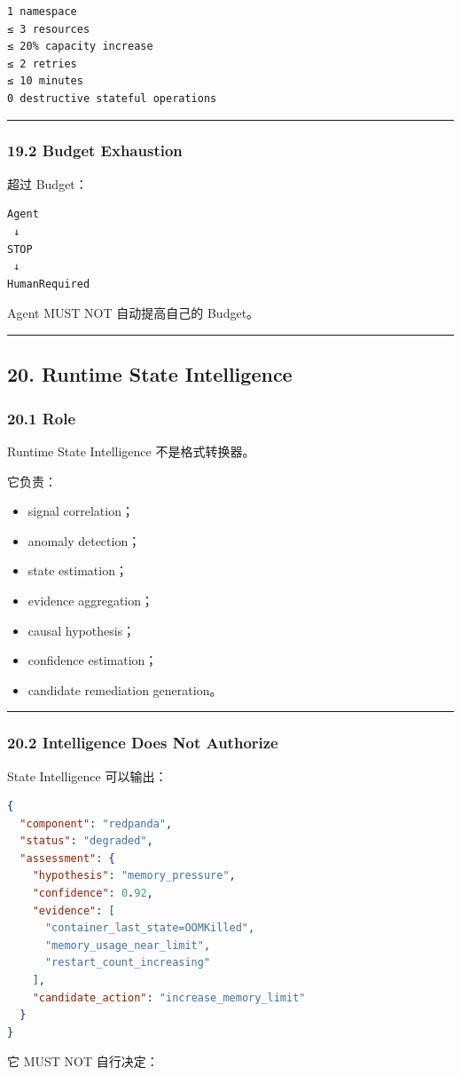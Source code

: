 \documentclass[11pt,a4paper]{article}
\begin{document}
\begin{lstlisting}[language=text]
1 namespace
≤ 3 resources
≤ 20% capacity increase
≤ 2 retries
≤ 10 minutes
0 destructive stateful operations
\end{lstlisting}
\vspace{0.5em}\hrule\vspace{0.5em}
\subsubsection{19.2 Budget Exhaustion}
超过 Budget：

\begin{lstlisting}[language=text]
Agent
 ↓
STOP
 ↓
HumanRequired
\end{lstlisting}
Agent MUST NOT 自动提高自己的 Budget。

\vspace{0.5em}\hrule\vspace{0.5em}
\subsection{20. Runtime State Intelligence}
\subsubsection{20.1 Role}
Runtime State Intelligence 不是格式转换器。

它负责：

\begin{itemize}
  \item signal correlation；
  \item anomaly detection；
  \item state estimation；
  \item evidence aggregation；
  \item causal hypothesis；
  \item confidence estimation；
  \item candidate remediation generation。
\end{itemize}
\vspace{0.5em}\hrule\vspace{0.5em}
\subsubsection{20.2 Intelligence Does Not Authorize}
State Intelligence 可以输出：

\begin{lstlisting}[language=json]
{
  "component": "redpanda",
  "status": "degraded",
  "assessment": {
    "hypothesis": "memory_pressure",
    "confidence": 0.92,
    "evidence": [
      "container_last_state=OOMKilled",
      "memory_usage_near_limit",
      "restart_count_increasing"
    ],
    "candidate_action": "increase_memory_limit"
  }
}
\end{lstlisting}
它 MUST NOT 自行决定：
\end{document}
